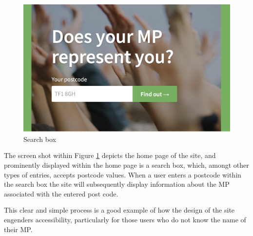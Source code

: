 \begin{figure}[h]
  \centering
  \includegraphics[scale=0.30]{images/they-work-for-you-implementation-search-box}
  \caption{Search box}
  \label{fig:they-work-for-you-implementation-search-box}
\end{figure}

The screen shot within Figure \ref{fig:they-work-for-you-implementation-search-box} depicts the home page of the site,
and prominently displayed within the home page is a search box, which, amongt other types of entries, accepts postcode \cite{postcodes-uk} values.
When a user enters a postcode within the search box the site will subsequently display information about the MP associated with the entered post code.

This clear and simple process is a good example of how the design of the site engenders accessibility,
particularly for those users who do not know the name of their MP.

